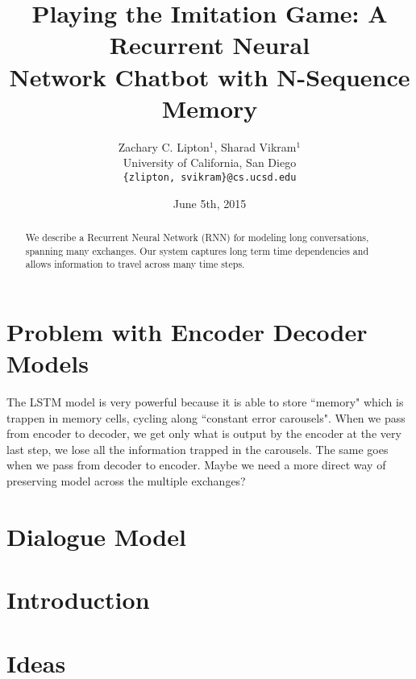 \documentclass[]{article}
\begin{document}
\title{Playing the Imitation Game:  A Recurrent Neural \\
 Network Chatbot with N-Sequence Memory}

\author{Zachary C. Lipton$^1$, Sharad Vikram$^1$\\
University of California, San Diego\\
\texttt{\{zlipton, svikram\}@cs.ucsd.edu}
}

\date{June 5th, 2015}
\maketitle


\begin{abstract}
We describe a Recurrent Neural Network (RNN) for modeling long conversations, spanning many exchanges. Our system captures long term time dependencies and allows information to travel across many time steps.
\end{abstract}


\section{Problem with Encoder Decoder Models}
The LSTM model is very powerful because it is able to store ``memory" which is trappen in memory cells, cycling along ``constant error carousels". When we pass from encoder to decoder, we get only what is output by the encoder at the very last step, we lose all the information trapped in the carousels. The same goes when we pass from decoder to encoder. Maybe we need a more direct way of preserving model across the multiple exchanges?


\section{Dialogue Model}




\section{Introduction}
\section{Ideas}
\end{document}
